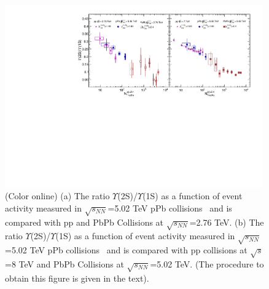    




\begin{figure}
  \begin{center}
\includegraphics[width=0.99\textwidth]{Figures/ExpOverview/Fig_LHC_Y2SByY1S_NTrk.pdf}
\caption{(Color online)
  (a) The ratio $\Upsilon$(2S)/$\Upsilon$(1S) as a function of event activity measured in 
$\sqrt{s_{NN}}$=5.02 TeV pPb collisions~\cite{CMS:2013jsu} and is compared with pp
and PbPb Collisions at $\sqrt{s_{NN}}$=2.76 TeV.
(b) The ratio $\Upsilon$(2S)/$\Upsilon$(1S) as a function of event activity measured in 
$\sqrt{s_{NN}}$=5.02 TeV pPb collisions~\cite{CMS:2013jsu} and is compared with pp
collisions at $\sqrt{s}$=8 TeV \cite{CMS:2020fae} and PbPb Collisions at $\sqrt{s_{NN}}$=5.02 TeV.
(The procedure to obtain this figure is given in the text).
}
\label{fig:UpsilonpPb}
\end{center}
\end{figure}





